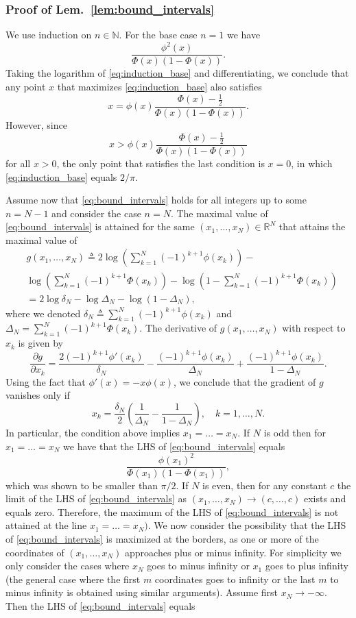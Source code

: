 \documentclass[letterpaper, conference]{IEEEtran}      %
\begin{document}
\subsubsection*{Proof of Lem.~\ref{lem:bound_intervals}}
We use induction on $n \in \mathbb N$. For the base case $n=1$ we have 
\begin{equation} \label{eq:induction_base}
\frac{  \phi^2(x)} 
{\Phi(x) \left(1 - \Phi(x) \right) }. 
\end{equation}
Taking the logarithm of \eqref{eq:induction_base} and differentiating, we conclude that any point $x$ that maximizes \eqref{eq:induction_base} also satisfies
\[
x = \phi(x) \frac{\Phi(x) -\frac{1}{2}}{\Phi(x)(1-\Phi(x))} .
\]
However, since 
\[
x > \phi(x) \frac{\Phi(x) -\frac{1}{2}}{\Phi(x)(1-\Phi(x))}
\]
for all $x > 0$, the only point that satisfies the last condition is $x=0$, in which \eqref{eq:induction_base} equals $2/\pi$. \par
Assume now that \eqref{eq:bound_intervals} holds for all integers up to some $n = N-1$ and consider the case $n = N$. The maximal value of \eqref{eq:bound_intervals} is attained for the same $(x_1,\ldots,x_N) \in \mathbb R^N$ that attains the maximal value of 
\begin{align*}
& g(x_1,\ldots, x_N) \triangleq 2 \log \left(  \sum_{k=1}^{N} (-1)^{k+1} \phi(x_k) \right) - \\
&  \log
\left( \sum_{k=1}^N (-1)^{k+1} \Phi(x_k) \right)
-\log \left(1 -  \sum_{k=1}^N (-1)^{k+1} \Phi(x_k) \right) \\
& = 2 \log \delta_N - \log \Delta_N - \log \left(1 - \Delta_N  \right),
\end{align*}
where we denoted $\delta_N \triangleq \sum_{k=1}^{N} (-1)^{k+1} \phi(x_k)$ and $\Delta_N =  \sum_{k=1}^N (-1)^{k+1} \Phi(x_k)$. The derivative of $g(x_1,\ldots,x_N)$ with respect to $x_k$ is given by
\[
\frac{\partial  g}{\partial x_k} = \frac{2 (-1)^{k+1} \phi'(x_k)}{\delta_N} -\frac{(-1)^{k+1} \phi(x_k)}{\Delta_N } + \frac{(-1)^{k+1} \phi(x_k)}{1-\Delta_N }.
\]
Using the fact that $\phi'(x) = -x \phi(x)$, we conclude that the gradient of $g$ vanishes only if
\[
x_k = \frac{\delta_N}{2} \left( \frac{1}{\Delta_N} - \frac{1}{1-\Delta_N} \right),\quad k=1,\ldots,N.
\]
In particular, the condition above implies $x_1 = \ldots = x_N$. If $N$ is odd then for $x_1=\ldots =x_N$ we have that the LHS of \eqref{eq:bound_intervals} equals
\[
\frac{\phi(x_1)^2}{ \Phi(x_1) (1 - \Phi(x_1))},
\]
which was shown to be smaller than $\pi/2$. If $N$ is even, then for any constant $c$ the limit of the LHS of \eqref{eq:bound_intervals} as $(x_1,\ldots,x_N)\rightarrow (c,\ldots,c)$ exists and equals zero. Therefore, the maximum of the LHS of \eqref{eq:bound_intervals} is not attained at the line $x_1=\ldots=x_N)$. We now consider the possibility that the LHS of \eqref{eq:bound_intervals} is maximized at the borders, as one or more of the coordinates of $(x_1,\ldots,x_N)$ approaches plus or minus infinity. For simplicity we only consider the cases where $x_N$ goes to minus infinity or $x_1$ goes to plus infinity (the general case where the first $m$ coordinates goes to infinity or the last $m$ to minus infinity is obtained using similar arguments). Assume first $x_N \rightarrow -\infty$. Then the LHS of \eqref{eq:bound_intervals} equals
\end{document}
